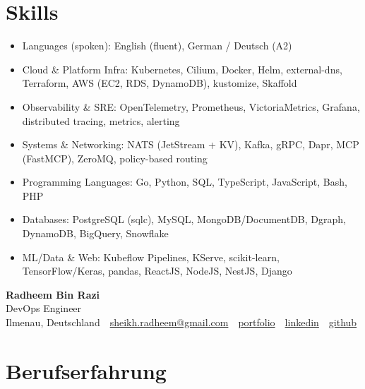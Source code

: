 \documentclass[10pt,a4paper]{resume}
\makeatletter
\newcommand{\Portfolio}{https://radheem.github.io/my-cv}
\newcommand{\PortfolioText}{portfolio}
\newcommand{\GitHub}{https://github.com/radheem}
\newcommand{\LinkedIn}{https://www.linkedin.com/in/radheem-razi}
\newcommand{\Email}{sheikh.radheem@gmail.com}
\makeatother
\begin{document}
\section{Skills}

\begin{itemize}[leftmargin=1.4em,nosep,topsep=2pt]
  \item Languages (spoken): English (fluent), German / Deutsch (A2)
  \item Cloud \& Platform Infra: Kubernetes, Cilium, Docker, Helm, external-dns, Terraform, AWS (EC2, RDS, DynamoDB), kustomize, Skaffold
  \item Observability \& SRE: OpenTelemetry, Prometheus, VictoriaMetrics, Grafana, distributed tracing, metrics, alerting
  \item Systems \& Networking: NATS (JetStream + KV), Kafka, gRPC, Dapr, MCP (FastMCP), ZeroMQ, policy-based routing
  \item Programming Languages: Go, Python, SQL, TypeScript, JavaScript, Bash, PHP
  \item Databases: PostgreSQL (sqlc), MySQL, MongoDB/DocumentDB, Dgraph, DynamoDB, BigQuery, Snowflake
  \item ML/Data \& Web: Kubeflow Pipelines, KServe, scikit-learn, TensorFlow/Keras, pandas, ReactJS, NodeJS, NestJS, Django
\end{itemize}

\clearpage
{}

\begin{center}
  {\huge\bfseries Radheem Bin Razi}\\[3pt]
  {\large DevOps Engineer}\\[6pt]
  \small
  Ilmenau, Deutschland \,\textbar\,
  \href{mailto:\Email}{\Email} \,\textbar\,
  \href{\Portfolio}{\PortfolioText} \,\textbar\,
  \href{\LinkedIn}{linkedin} \,\textbar\,
  \href{\GitHub}{github}
\end{center}
\vspace{2pt}

\section{Berufserfahrung}
\end{document}
